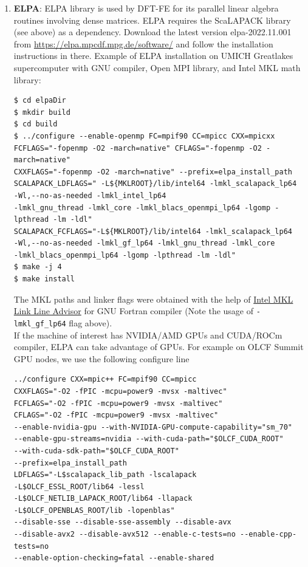\begin{enumerate}
\item {\bf ELPA}: ELPA library is used by DFT-FE for its parallel linear algebra routines involving dense matrices. ELPA requires the ScaLAPACK library (see above) as a dependency. Download the latest version elpa-2022.11.001 from \url{https://elpa.mpcdf.mpg.de/software/} and follow the installation instructions in there. Example of ELPA installation on UMICH Greatlakes supercomputer with GNU compiler, Open MPI library, and Intel MKL math library:
\begin{verbatim}
$ cd elpaDir
$ mkdir build
$ cd build
$ ../configure --enable-openmp FC=mpif90 CC=mpicc CXX=mpicxx 
FCFLAGS="-fopenmp -O2 -march=native" CFLAGS="-fopenmp -O2 -march=native" 
CXXFLAGS="-fopenmp -O2 -march=native" --prefix=elpa_install_path
SCALAPACK_LDFLAGS=" -L${MKLROOT}/lib/intel64 -lmkl_scalapack_lp64
-Wl,--no-as-needed -lmkl_intel_lp64
-lmkl_gnu_thread -lmkl_core -lmkl_blacs_openmpi_lp64 -lgomp -lpthread -lm -ldl" 
SCALAPACK_FCFLAGS="-L${MKLROOT}/lib/intel64 -lmkl_scalapack_lp64
-Wl,--no-as-needed -lmkl_gf_lp64 -lmkl_gnu_thread -lmkl_core
-lmkl_blacs_openmpi_lp64 -lgomp -lpthread -lm -ldl"
$ make -j 4
$ make install
\end{verbatim}
The MKL paths and linker flags were obtained with the help of \href{https://software.intel.com/en-us/articles/intel-mkl-link-line-advisor}{Intel MKL Link Line Advisor} for GNU Fortran compiler (Note the usage of \verb|-lmkl_gf_lp64| flag above).\\ 

If the machine of interest has NVIDIA/AMD GPUs and CUDA/ROCm compiler, ELPA can take advantage of GPUs. For example on OLCF Summit GPU nodes, we use the following configure line
\begin{verbatim}
../configure CXX=mpic++ FC=mpif90 CC=mpicc 
CXXFLAGS="-O2 -fPIC -mcpu=power9 -mvsx -maltivec"
FCFLAGS="-O2 -fPIC -mcpu=power9 -mvsx -maltivec" 
CFLAGS="-O2 -fPIC -mcpu=power9 -mvsx -maltivec"
--enable-nvidia-gpu --with-NVIDIA-GPU-compute-capability="sm_70" 
--enable-gpu-streams=nvidia --with-cuda-path="$OLCF_CUDA_ROOT"
--with-cuda-sdk-path="$OLCF_CUDA_ROOT" 
--prefix=elpa_install_path 
LDFLAGS="-L$scalapack_lib_path -lscalapack  
-L$OLCF_ESSL_ROOT/lib64 -lessl 
-L$OLCF_NETLIB_LAPACK_ROOT/lib64 -llapack 
-L$OLCF_OPENBLAS_ROOT/lib -lopenblas"
--disable-sse --disable-sse-assembly --disable-avx 
--disable-avx2 --disable-avx512 --enable-c-tests=no --enable-cpp-tests=no
--enable-option-checking=fatal --enable-shared 
\end{verbatim}



\end{enumerate}
